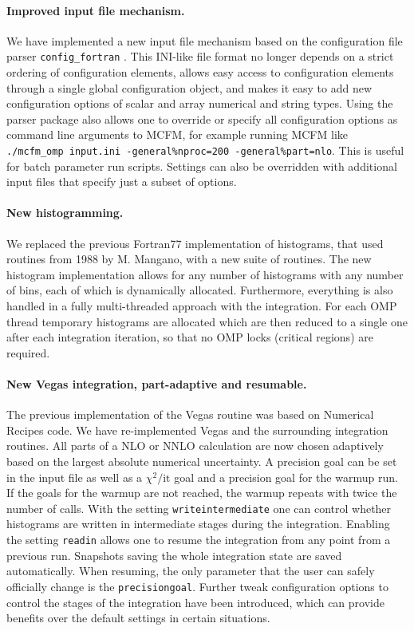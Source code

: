 \paragraph{Improved input file mechanism.}

We have implemented a new input file mechanism based on the configuration file parser \texttt{config\_fortran} 
\cite{JTeunis}.
This INI-like file format no longer depends on a strict ordering of configuration elements, allows easy access to
configuration elements through a single global configuration object, and makes it easy to add new configuration
options of scalar and array numerical and string types. Using the parser package also allows one
to override or specify all configuration options as command line arguments to MCFM, for example running
MCFM like \texttt{./mcfm\_omp input.ini -general\%nproc=200 -general\%part=nlo}. This is useful for batch
parameter run scripts. Settings can also be overridden with additional input files that specify just a subset of 
options.

\paragraph{New histogramming.}

We replaced the previous Fortran77 implementation of histograms, that used routines from 1988 by M. Mangano,
with a new suite of routines.
The new histogram implementation allows for any number of histograms with any number of bins,
each of which is dynamically allocated. Furthermore, everything is also handled in a fully multi-threaded approach with 
the integration. For each OMP thread temporary 
histograms are allocated which are then reduced to a single one after each integration iteration, so that
no OMP locks (critical regions) are required. 

\paragraph{New Vegas integration, part-adaptive and resumable.}

The previous implementation of the Vegas routine was based on Numerical Recipes code. We have re-implemented
Vegas and the surrounding integration routines. All parts of a NLO or NNLO calculation are now
chosen adaptively based on the largest absolute numerical uncertainty. A precision goal can be set
in the input file as well as a $\chi^2/\text{it}$ goal and a precision goal for the warmup run. If
the goals for the warmup are not reached, the warmup repeats with twice the number of calls. With the
setting \texttt{writeintermediate} one can control whether histograms are written in intermediate
stages during the integration. Enabling the setting \texttt{readin} allows one to resume the integration
from any point from a previous run. Snapshots saving the whole integration state are saved automatically.
When resuming, the only parameter that the user can safely officially change is the \texttt{precisiongoal}. Further
tweak configuration options to control the stages of the integration have been introduced, which can provide
benefits over the default settings in certain situations.

